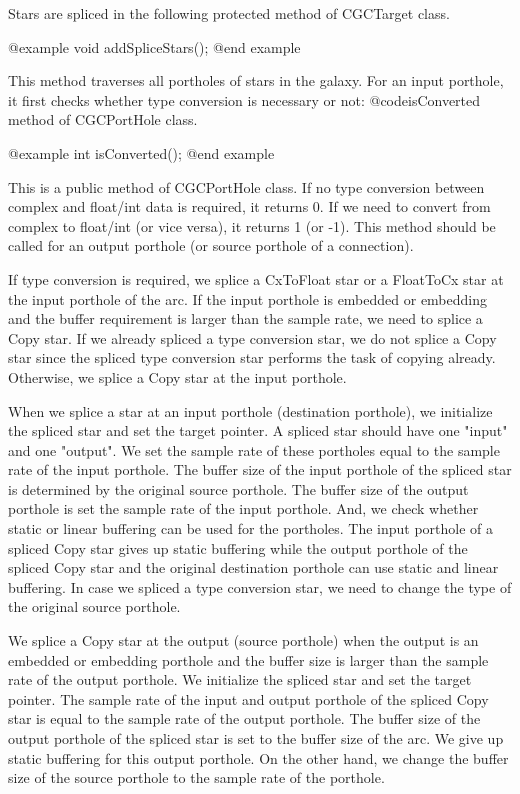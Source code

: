{Stars are spliced in the following protected method of CGCTarget class.

@example
void addSpliceStars();
@end example

This method traverses all portholes of stars in the galaxy. For an input
porthole, it first checks whether type conversion is necessary or not:
@code{isConverted} method of CGCPortHole class.

@example
int isConverted();
@end example

This is a public method of CGCPortHole class. If no type conversion between
complex and float/int data is required, it returns 0. If we need to convert
from complex to float/int (or vice versa), it returns 1 (or -1). This 
method should be called for an output porthole (or source porthole of a
connection).

If type conversion is required, we splice a CxToFloat star or a FloatToCx
star at the input porthole of the arc. If the input porthole is embedded or
embedding and the buffer requirement is larger than the sample rate, 
we need to splice a Copy star. If we already spliced a type conversion
star, we do not splice a Copy star since the spliced type conversion star
performs the task of copying already. Otherwise, we splice a Copy star at
the input porthole.

When we splice a star at an input porthole (destination porthole), we
initialize the spliced star and set the target pointer. A spliced star should
have one "input" and one "output". We set the sample rate of these portholes
equal to the sample rate of the input porthole. The buffer size of the input
porthole of the spliced star is determined by the original source porthole.
The buffer size of the output porthole is set the sample rate of the
input porthole. And, we check whether static or linear buffering can be used
for the portholes. The input porthole of a spliced Copy star gives up
static buffering while the output porthole of the spliced Copy star and
the original destination porthole can use static and linear buffering.
In case we spliced a type conversion star, we need to change the type of the
original source porthole.

We splice a Copy star at the output (source porthole) when the output 
is an embedded or
embedding porthole and the buffer size is larger than the sample rate of
the output porthole. We initialize the spliced star and set the target
pointer. The sample rate of the input and output porthole of
the spliced Copy star is equal to the sample rate of the output porthole.
The buffer size of the output porthole of the spliced star is set to the
buffer size of the arc. We give up static buffering for this output
porthole. On the other hand, we change the buffer size of
the source porthole to the sample rate of the porthole. 

}
